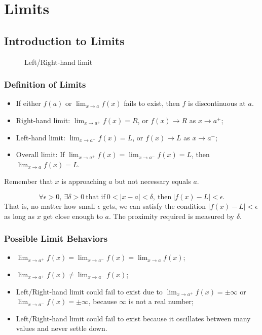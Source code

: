 \chapter{Limits}
\section{Introduction to Limits}
\begin{figure}[H]
  \centering
  \caption{Left/Right-hand limit}
\end{figure}

\subsection{Definition of Limits}
\begin{itemize}
  \item If either $f(a)$ or $\lim_{x\to a} f(x)$ fails to exist, then $f$ is discontinuous at $a$.
  \item Right-hand limit: $\lim_{x\to a^+}f(x)=R$, or $f(x)\to R$ as $x\to a^+$;
  \item Left-hand limit: $\lim_{x\to a^-}f(x)=L$, or $f(x)\to L$ as $x\to a^-$;
  \item Overall limit: If $\lim_{x\to a^+}f(x)=\lim_{x\to a^-}f(x)=L$, then $\lim_{x\to a}f(x)=L$.
\end{itemize}

\begin{note}Remember that $x$ is approaching $a$ but not necessary equals $a$.\end{note}
\begin{definition}
\[
\forall\epsilon>0,\ \exists\delta>0\ \text{that if}\ 0<\lvert x-a\rvert<\delta,\ \text{then}\ \lvert f(x)-L\rvert<\epsilon.
\]
That is, no matter how small $\epsilon$ gets, we can satisfy the condition $\lvert f(x)-L\rvert<\epsilon$ as long as $x$ get close enough to $a$. The proximity required is measured by $\delta$.
\end{definition}

\subsection{Possible Limit Behaviors}
\begin{itemize}
  \item $\lim_{x\to a^+}f(x)=\lim_{x\to a^-}f(x)=\lim_{x\to a}f(x)$;
  \item $\lim_{x\to a^+}f(x)\neq\lim_{x\to a^-}f(x)$;
  \item Left\slash Right-hand limit could fail to exist due to $\lim_{x\to a^+}f(x)=\pm\infty$ or $\lim_{x\to a^-}f(x)=\pm\infty$, because $\infty$ is not a real number;
  \item Left\slash Right-hand limit could fail to exist because it oscillates between many values and never settle down.
\end{itemize}

